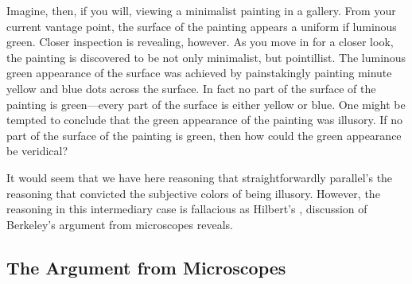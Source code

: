 \documentclass[12pt]{article}
\begin{document}
Imagine, then, if you will, viewing a minimalist painting in a gallery. From your current vantage point, the surface of the painting appears a uniform if luminous green. Closer inspection is revealing, however. As you move in for a closer look, the painting is discovered to be not only minimalist, but pointillist. The luminous green appearance of the surface was achieved by painstakingly painting minute yellow and blue dots across the surface. In fact no part of the surface of the painting is green---every part of the surface is either yellow or blue. One might be tempted to conclude that the green appearance of the painting was illusory. If no part of the surface of the painting is green, then how could the green appearance be veridical? 

It would seem that we have here reasoning that straightforwardly parallel's the reasoning that convicted the subjective colors of being illusory. However, the reasoning in this intermediary case is fallacious as Hilbert's \citeyear[chapter 2]{Hilbert:1987jq}, discussion of Berkeley's \citeyear{Berkeley:1734fk} argument from microscopes reveals.


\subsection{The Argument from Microscopes}\label{sub:the_argument_from_microscopes} %
\end{document}
